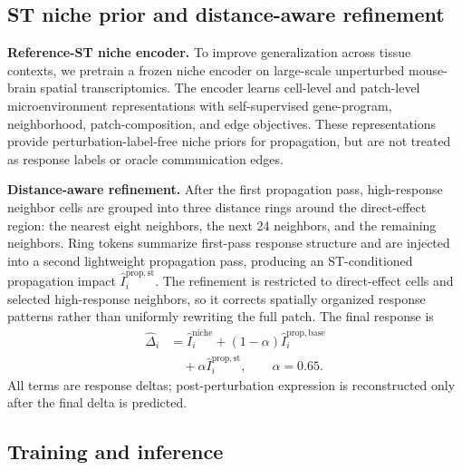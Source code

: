\documentclass[sigconf,review,balance=false]{acmart}
\begin{document}
\subsection{ST niche prior and distance-aware refinement}
\label{sec:method_st_refinement}

\noindent\textbf{Reference-ST niche encoder.}
To improve generalization across tissue contexts, we pretrain a frozen niche encoder on large-scale unperturbed mouse-brain spatial transcriptomics. The encoder learns cell-level and patch-level microenvironment representations with self-supervised gene-program, neighborhood, patch-composition, and edge objectives. These representations provide perturbation-label-free niche priors for propagation, but are not treated as response labels or oracle communication edges.

\noindent\textbf{Distance-aware refinement.}
After the first propagation pass, high-response neighbor cells are grouped into three distance rings around the direct-effect region: the nearest eight neighbors, the next 24 neighbors, and the remaining neighbors. Ring tokens summarize first-pass response structure and are injected into a second lightweight propagation pass, producing an ST-conditioned propagation impact $\widehat I_i^{\mathrm{prop},\mathrm{st}}$. The refinement is restricted to direct-effect cells and selected high-response neighbors, so it corrects spatially organized response patterns rather than uniformly rewriting the full patch. The final response is
\begin{equation}
\label{eq:final_response_prediction}
\begin{aligned}
\widehat\Delta_i
&= \widehat I_i^{\mathrm{niche}}
 + (1-\alpha)\widehat I_i^{\mathrm{prop},\mathrm{base}}\\
&\quad + \alpha\widehat I_i^{\mathrm{prop},\mathrm{st}},
\qquad \alpha=0.65 .
\end{aligned}
\end{equation}
All terms are response deltas; post-perturbation expression is reconstructed only after the final delta is predicted.

\subsection{Training and inference}
\label{sec:training_inference}
\end{document}
